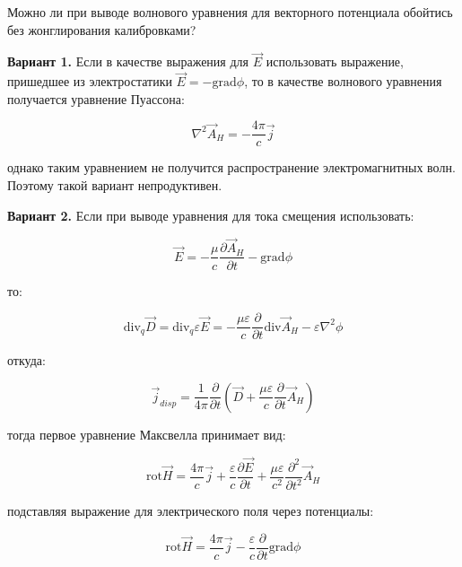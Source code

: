 \documentclass[12pt, a4paper]{article}
\begin{document}
Можно ли при выводе волнового уравнения для векторного потенциала обойтись без жонглирования калибровками?

\textbf{Вариант 1.} Если в качестве выражения для $\vec{E}$ использовать выражение, пришедшее из электростатики $\vec{E} = -\text{grad} \phi$, то в качестве волнового уравнения получается уравнение Пуассона:

\begin{equation}
\nabla^2 \vec{A}_H = -\frac{4\pi}{c} \vec{j}
\label{eq:poisson_wave}
\end{equation}

однако таким уравнением не получится распространение электромагнитных волн. Поэтому такой вариант непродуктивен.

\textbf{Вариант 2.} Если при выводе уравнения для тока смещения использовать:

\begin{equation}
\vec{E} = -\frac{\mu}{c} \frac{\partial \vec{A}_H}{\partial t} - \text{grad} \phi
\label{eq:E_full_again}
\end{equation}

то:

\begin{equation}
\text{div}_q \vec{D} = \text{div}_q \varepsilon \vec{E} = -\frac{\mu \varepsilon}{c} \frac{\partial}{\partial t} \text{div} \vec{A}_H - \varepsilon \nabla^2 \phi
\label{eq:div_D_full}
\end{equation}

откуда:

\begin{equation}
\vec{j}_{disp} = \frac{1}{4\pi} \frac{\partial}{\partial t} \left( \vec{D} + \frac{\mu \varepsilon}{c} \frac{\partial}{\partial t} \vec{A}_H \right)
\label{eq:disp_full}
\end{equation}

тогда первое уравнение Максвелла принимает вид:

\begin{equation}
\text{rot} \vec{H} = \frac{4\pi}{c} \vec{j} + \frac{\varepsilon}{c} \frac{\partial \vec{E}}{\partial t} + \frac{\mu \varepsilon}{c^2} \frac{\partial^2}{\partial t^2} \vec{A}_H
\label{eq:maxwell_extended}
\end{equation}

подставляя выражение для электрического поля через потенциалы:

\begin{equation}
\text{rot} \vec{H} = \frac{4\pi}{c} \vec{j} - \frac{\varepsilon}{c} \frac{\partial}{\partial t} \text{grad} \phi
\label{eq:rot_H_potentials}
\end{equation}
\end{document}
